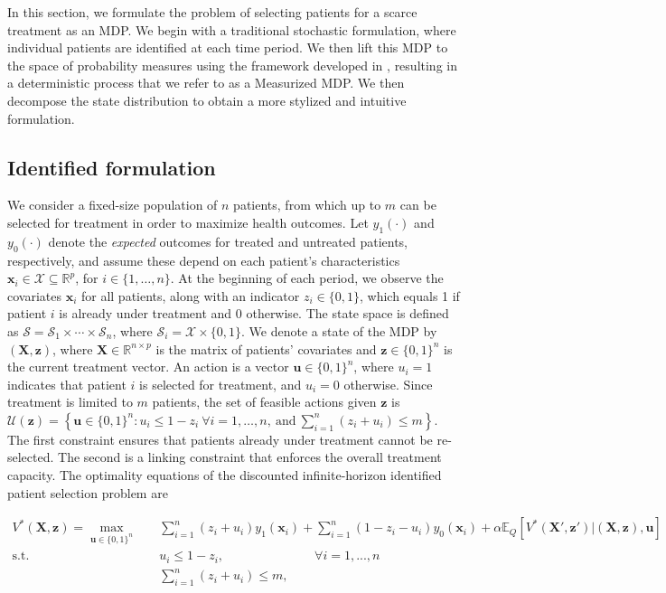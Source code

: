 \documentclass[12pt,a4paper]{article}
\newcommand{\bx}{\mathbf{x}}
\newcommand{\bu}{\mathbf{u}}
\newcommand{\bz}{\mathbf{z}}
\newcommand{\bX}{\mathbf{X}}
\newcommand{\mX}{\mathcal{X}}
\begin{document}
  
    In this section, we formulate the problem of selecting patients for a scarce treatment as an MDP. We begin with a traditional stochastic formulation, where individual patients are identified at each time period. We then lift this MDP to the space of probability measures using the framework developed in \cite{measurized}, resulting in a deterministic process that we refer to as a Measurized MDP. We then decompose the state distribution to obtain a more stylized and intuitive formulation.


\subsection{Identified formulation}

	
We consider a fixed-size population of $n$ patients, from which up to $m$ can be selected for treatment in order to maximize health outcomes. Let $y_1(\cdot)$ and $y_0(\cdot)$ denote the {\it expected} outcomes for treated and untreated patients, respectively, and assume these depend on each patient's characteristics $\bx_i\in \mX\subseteq \mathbb{R}^p$, for $i \in \{1, \ldots, n\}$. At the beginning of each period, we observe the covariates $\bx_i$ for all patients, along with an indicator $z_i \in \{0,1\}$, which equals 1 if patient $i$ is already under treatment and 0 otherwise. The state space is defined as $\mathcal{S} = \mathcal{S}_1 \times \cdots \times \mathcal{S}_n$, where $\mathcal{S}_i = \mathcal{X} \times \{0,1\}$. We denote a state of the MDP by $(\bX,\bz)$, where $\bX\in \mathbb{R}^{n\times p}$ is the matrix of patients' covariates and $\bz\in \{0,1\}^n$ is the current treatment vector. An action is a vector $\bu \in \{0,1\}^n$, where $u_i = 1$ indicates that patient $i$ is selected for treatment, and $u_i = 0$ otherwise. Since treatment is limited to $m$ patients, the set of feasible actions given $\bz$ is
$\mathcal{U}(\bz) = \left\{ \bu \in \{0,1\}^n : u_i \leq 1 - z_i \ \forall i = 1, \ldots, n, \ \text{and} \ \sum_{i=1}^n (z_i + u_i) \leq m \right\}.
$
The first constraint ensures that patients already under treatment cannot be re-selected. The second is a linking constraint that enforces the overall treatment capacity.
 The optimality equations of the discounted infinite-horizon identified patient selection problem are
	
	\begin{align}
		V^*(\bX,\bz)=\max_{\bu \in \{0,1\}^n} & \quad \sum_{i=1}^n (z_i+u_i) y_1(\bx_i)+\sum_{i=1}^n (1-z_i-u_i) y_0(\bx_i)+ \alpha \mathbb{E}_Q [V^*(\bX',\bz')| (\bX,\bz), \bu ] \nonumber \\
		\mbox{s.t.}  &\quad  u_{i} \leq 1-z_{i}, \hspace{3cm} \forall i=1,...,n \label{knapsack_discrete} \tag{K}  \\
		& \quad \sum_{i=1}^n (z_i+u_{i}) \leq m, \nonumber
	\end{align}
	
\end{document}
